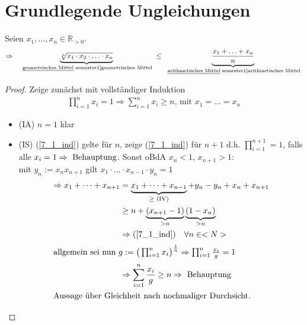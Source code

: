 \section{Grundlegende Ungleichungen}
\begin{proposition}
	Seien $x_1, \dotsc, x_n\in\mathbb{R}_{>0}$.
	\[\Rightarrow \;\;\underbrace{\sqrt[n]{x_1\cdot x_2\cdot \dotsc \cdot x_n}}_{\text{\begriff{geometrisches Mittel}}} \le \underbrace{\frac{x_1 + \dotsc + x_n}{n}}_{\text{\begriff{arithmetisches Mittel}}}\]
\end{proposition}
\begin{proof}
	Zeige zunächst mit vollständiger Induktion
	\begin{align} %
	\prod_{i=1}^{n}x_i=1 \Rightarrow \sum\limits_{i=1}^{n} x_i \geq n \text{, mit } x_1=\dots=x_n \label{7_1_ind}
	\end{align}
	\begin{itemize}
		\item (IA) $n = 1$ klar
		\item (IS) (\ref{7_1_ind}) gelte für $n$, zeige (\ref{7_1_ind}) für $n+1$ d.h. $\prod_{i=1}^{n+1} = 1$, falls alle $x_i=1 \Rightarrow \text{ Behauptung}$. Sonst oBdA $x_n < 1$, $x_{n+1} > 1:$\\ mit $y_n:=x_n x_{n+1}$ gilt $x_1\cdot\dots\cdot x_{n-1}\cdot y_n=1$
		\begin{align*}
		\Rightarrow x_1 + \dots + x_{n+1} &= \underbrace{x_1+\dots+x_{n-1}}_{\geq \text{ (IV)}} + y_n - y_n + x_n+x_{n+1}\\ 
		&\geq n + \underbrace{(x_{n+1} -1)}_{>n}\underbrace{(1-x_n)}_{>n}\\ 
		&\Rightarrow (\ref{7_1_ind}) \quad\forall n \in <N>\\ 
		\shortintertext{allgemein sei nun $g:=\big( \prod_{i=1}^{n} x_i \big)^{\frac{1}{n}} \Rightarrow \prod_{i=1}^{n} \frac{x_i}{g} = 1$}
		&\Rightarrow \sum\limits_{i=1}^{n} \frac{x_i}{g} \geq n \Rightarrow \text{ Behauptung}\\ 
		\shortintertext{Aussage über Gleichheit nach nochmaliger Durchsicht.}
		\end{align*}
	\end{itemize} 
\end{proof}


